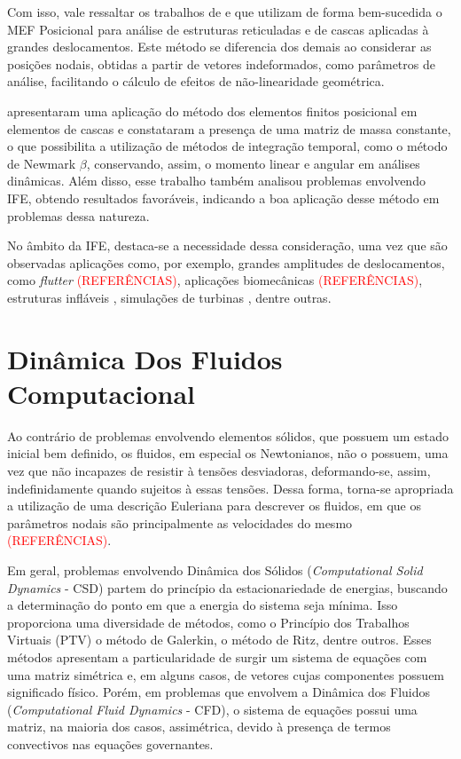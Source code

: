 \documentclass[_ArquivoPrincipal.tex]{subfiles}
\begin{document}
Com isso, vale ressaltar os trabalhos de  e  que utilizam de forma bem-sucedida o MEF Posicional para análise de estruturas reticuladas e de cascas aplicadas à grandes deslocamentos. Este método se diferencia dos demais ao considerar as posições nodais, obtidas a partir de vetores indeformados, como parâmetros de análise, facilitando o cálculo de efeitos de não-linearidade geométrica.

 apresentaram uma aplicação do método dos elementos finitos posicional em elementos de cascas e constataram a presença de uma matriz de massa constante, o que possibilita a utilização de métodos de integração temporal, como o método de Newmark $\beta$, conservando, assim, o momento linear e angular em análises dinâmicas. Além disso, esse trabalho também analisou problemas envolvendo IFE, obtendo resultados favoráveis, indicando a boa aplicação desse método em problemas dessa natureza.

No âmbito da IFE, destaca-se a necessidade dessa consideração, uma vez que são observadas aplicações como, por exemplo, grandes amplitudes de deslocamentos, como \textit{flutter} \textcolor{red}{(REFERÊNCIAS)}, aplicações biomecânicas \textcolor{red}{(REFERÊNCIAS)}, estruturas infláveis \cite{karagiozis2011computational}, simulações de turbinas \cite{bazilevs20113d}, dentre outras.

\section{Dinâmica Dos Fluidos Computacional} \label{CFD}

Ao contrário de problemas envolvendo elementos sólidos, que possuem um estado inicial bem definido, os fluidos, em especial os Newtonianos, não o possuem, uma vez que não incapazes de resistir à tensões desviadoras, deformando-se, assim, indefinidamente quando sujeitos à essas tensões. Dessa forma, torna-se apropriada a utilização de uma descrição Euleriana para descrever os fluidos, em que os parâmetros nodais são principalmente as velocidades do mesmo \textcolor{red}{(REFERÊNCIAS)}.

Em geral, problemas envolvendo Dinâmica dos Sólidos (\textit{Computational Solid Dynamics} - CSD) partem do princípio da estacionariedade de energias, buscando a determinação do ponto em que a energia do sistema seja mínima. Isso proporciona uma diversidade de métodos, como o Princípio dos Trabalhos Virtuais (PTV) o método de Galerkin, o método de Ritz, dentre outros. Esses métodos apresentam a particularidade de surgir um sistema de equações com uma matriz simétrica e, em alguns casos, de vetores cujas componentes possuem significado físico. Porém, em problemas que envolvem a Dinâmica dos Fluidos (\textit{Computational Fluid Dynamics} - CFD), o sistema de equações possui uma matriz, na maioria dos casos, assimétrica, devido à presença de termos convectivos nas equações governantes.
\end{document}
